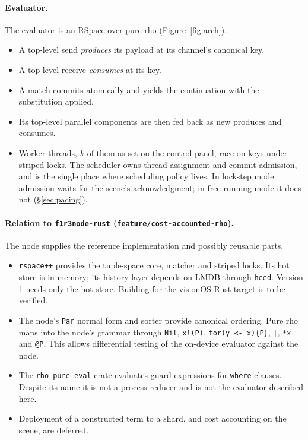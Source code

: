 \documentclass[11pt]{article}
\begin{document}
\paragraph{Evaluator.} The evaluator is an RSpace over pure rho (Figure~\ref{fig:arch}).
\begin{itemize}
  \item A top-level send \emph{produces} its payload at its channel's canonical key.
  \item A top-level receive \emph{consumes} at its key.
  \item A match commits atomically and yields the continuation with the substitution applied.
  \item Its top-level parallel components are then fed back as new produces and consumes.
  \item Worker threads, $k$ of them as set on the control panel, race on keys under striped locks. The
    scheduler owns thread assignment and commit admission, and is the single place where
    scheduling policy lives. In lockstep mode admission waits for the scene's acknowledgment;
    in free-running mode it does not (\S\ref{sec:pacing}).
\end{itemize}

\paragraph{Relation to \texttt{f1r3node-rust} (\texttt{feature/cost-accounted-rho}).}
The node supplies the reference implementation and possibly reusable parts.
\begin{itemize}
  \item \texttt{rspace++} provides the tuple-space core, matcher and striped locks. Its hot
    store is in memory; its history layer depends on LMDB through \texttt{heed}. Version 1
    needs only the hot store. Building for the visionOS Rust target is to be verified.
  \item The node's \texttt{Par} normal form and sorter provide canonical ordering. Pure rho
    maps into the node's grammar through \texttt{Nil}, \texttt{x!(P)},
    \texttt{for(y <- x)\{P\}}, \texttt{|}, \texttt{*x} and \texttt{@P}. This allows
    differential testing of the on-device evaluator against the node.
  \item The \texttt{rho-pure-eval} crate evaluates guard expressions for \texttt{where}
    clauses. Despite its name it is not a process reducer and is not the evaluator
    described here.
  \item Deployment of a constructed term to a shard, and cost accounting on the scene, are
    deferred.
\end{itemize}
\end{document}
